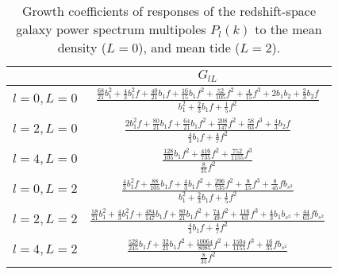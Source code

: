 \documentclass[a4paper,11pt]{article}
\begin{document}
\begin{table}[tbp]
    \centering
    \caption{Growth coefficients of responses of the redshift-space galaxy
    power spectrum multipoles $P_l(k)$ to the mean density ($L=0$), and mean
    tide ($L=2$).}
    \label{tab:G_l}
    \begin{tabular}{c|c}
        \hline
        & $G_{lL}$ \\
        \hline
        $l=0,L=0$
        & $\displaystyle\frac{\frac{68}{21}b_1^2 + \frac43b_1^2f + \frac{40}{21}b_1f
            + \frac{16}{15}b_1f^2 + \frac{52}{105}f^2 + \frac4{15}f^3 + 2b_1b_2 + \frac23b_2f}
        {b_1^2 + \frac23b_1f + \frac15f^2}$ \\[1em]
        $l=2,L=0$
        & $\displaystyle\frac{2b_1^2f+\frac{80}{21}b_1f + \frac{64}{21}b_1f^2
            + \frac{208}{147}f^2 + \frac{58}{63}f^3 + \frac43b_2f}
        {\frac43b_1f + \frac47f^2}$ \\[1em]
        $l=4,L=0$
        & $\displaystyle\frac{\frac{128}{105}b_1f^2 + \frac{416}{735}f^2 + \frac{752}{1155}f^3}
        {\frac8{35}f^2}$ \\[1em]
        $l=0,L=2$
        & $\displaystyle\frac{\frac43b_1^2f + \frac{88}{105}b_1f + \frac43b_1f^2
            + \frac{296}{735}f^2 + \frac8{15}f^3 + \frac8{45}fb_{s^2}}
        {b_1^2 + \frac23b_1f + \frac15f^2}$ \\[1em]
        $l=2,L=2$
        & $\displaystyle\frac{\frac{58}{21}b_1^2 + \frac43b_1^2f + \frac{484}{147}b_1f
            + \frac{80}{21}b_1f^2 + \frac{74}{49}f^2 + \frac{116}{63}f^3
            + \frac43b_1b_{s^2} + \frac{44}{63}fb_{s^2}}
        {\frac43b_1f + \frac47f^2}$ \\[1em]
        $l=4,L=2$
        & $\displaystyle\frac{\frac{528}{245}b_1f + \frac{32}{21}b_1f^2 + \frac{10064}{8085}f^2
            + \frac{1504}{1155}f^3 + \frac{16}{35}fb_{s^2}}
        {\frac8{35}f^2}$ \\
        \hline
    \end{tabular}
\end{table}
\end{document}
